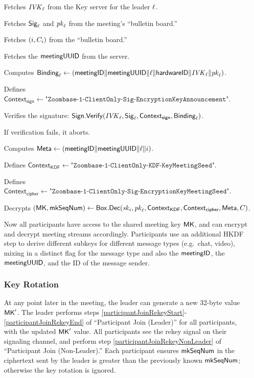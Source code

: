 \begingroup
\RaggedRight
\begin{enumerate*}
\item Fetches $\mathit{IVK}_{\ell}$ from the Key server for the leader $\ell$.
\item Fetches ${\sf Sig}_{\ell}$ and $\mathit{pk}_\ell$ from the meeting's ``bulletin board.''
\item Fetches $(i, C_i)$ from the ``bulletin board.''
\item Fetches the ${\sf meetingUUID}$ from the server.
\item Computes ${\sf Binding}_\ell \leftarrow \left( {\sf meetingID} \| \allowbreak {\sf meetingUUID} \| \ell
\allowbreak \| {\sf hardwareID} \| \mathit{IVK}_\ell \| \allowbreak \mathit{pk}_\ell \right)$.
\item Defines $\textsf{Context}_\textsf{sign} \leftarrow
\texttt{"Zoombase-1-ClientOnly-Sig-EncryptionKeyAnnouncement"}$.
\item Verifies the signature: ${\sf Sign}.\mathsf{Verify}(\mathit{IVK}_{\ell}, {\sf Sig}_\ell, \textsf{Context}_\textsf{sign},
{\sf Binding}_\ell)$.
\item If verification fails, it aborts.
\item Computes ${\sf Meta} \leftarrow \left({\sf meetingID} \| \allowbreak {\sf meetingUUID} \| \allowbreak \ell
\| i \right)$.
\item Defines $\textsf{Context}_\textsf{KDF} \leftarrow
\texttt{"Zoombase-1-ClientOnly-KDF-KeyMeetingSeed"}$.
\item Defines $\textsf{Context}_\textsf{cipher} \leftarrow
\texttt{"Zoombase-1-ClientOnly-Sig-EncryptionKeyMeetingSeed"}$.
\item Decrypts $({\sf MK}, \mathsf{mkSeqNum}) \leftarrow {\sf Box}.\mathsf{Dec}(\mathit{sk}_{i}, \mathit{pk}_{\ell},
\textsf{Context}_\textsf{KDF}, \textsf{Context}_\textsf{cipher}, {\sf Meta}, C)$.
   \label{participantJoinRekeyNonLeader}
\end{enumerate*}
\endgroup

Now all participants have access to the shared meeting key ${\sf MK}$, and can encrypt and decrypt
meeting streams accordingly. Participants use an additional HKDF step to derive different subkeys
for different message types (e.g.\ chat, video), mixing in a distinct flag for the message type and
also the ${\sf meetingID}$, the ${\sf meetingUUID}$, and the ID of the message sender.

\subsubsection{Key Rotation}
\label{subsubsec:keyrotation}
At any point later in the meeting, the leader can generate a new 32-byte value ${\sf MK}'$. The leader
performs steps \ref{participantJoinRekeyStart}-\ref{participantJoinRekeyEnd} of ``Participant Join
(Leader)'' for all participants, with the updated ${\sf MK}'$ value. All participants see the rekey
signal on their signaling channel, and perform step \ref{participantJoinRekeyNonLeader} of
``Participant Join (Non-Leader).'' Each participant ensures $\mathsf{mkSeqNum}$ in the ciphertext
sent by the leader is greater than the previously known $\mathsf{mkSeqNum}$; otherwise the key
rotation is ignored.

